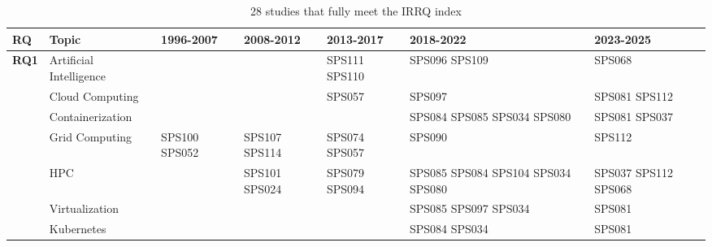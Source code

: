 \begin{table*}[htbp]
	\centering
	\caption{28 studies that fully meet the IRRQ index}
	\label{table:highest_IRRQ}
	\renewcommand{\arraystretch}{1.2}
	\setlength{\tabcolsep}{6pt}
	\begin{tabularx}{\textwidth}{p{0.8cm}p{2.5cm}>{\raggedright\arraybackslash}X>{\raggedright\arraybackslash}X>{\raggedright\arraybackslash}X>{\raggedright\arraybackslash}X>{\raggedright\arraybackslash}X}
		\toprule
		\textbf{RQ}                          & \textbf{Topic}         & \textbf{1996-2007} & \textbf{2008-2012}   & \textbf{2013-2017}          & \textbf{2018-2022}                               & \textbf{2023-2025}          \\
		\midrule
		\multirow{12}{*}[0em]{\textbf{RQ1}}  & Artificial Intelligence &                    &                      & SPS111 SPS110               & SPS096 SPS109                                    & SPS068                      \\
		\addlinespace[0.3em]
		                                     & Cloud Computing         &                    &                      & SPS057                      & SPS097                                           & SPS081 SPS112               \\
		\addlinespace[0.3em]
		                                     & Containerization        &                    &                      &                             & SPS084 SPS085 SPS034 SPS080                      & SPS081 SPS037               \\
		\addlinespace[0.3em]
		                                     & Grid Computing          & SPS100 SPS052      & SPS107 SPS114        & SPS074 SPS057               & SPS090                                           & SPS112                      \\
		\addlinespace[0.3em]
		                                     & HPC                     &                    & SPS101 SPS024        & SPS079 SPS094               & SPS085 SPS084 SPS104 SPS034 SPS080               & SPS037 SPS112 SPS068        \\
		\addlinespace[0.3em]
		                                     & Virtualization          &                    &                      &                             & SPS085 SPS097 SPS034                             & SPS081                      \\
		\addlinespace[0.3em]
		                                     & Kubernetes              &                    &                      &                             & SPS084 SPS034                                    & SPS081                      \\

\end{tabularx}
\end{table*}
